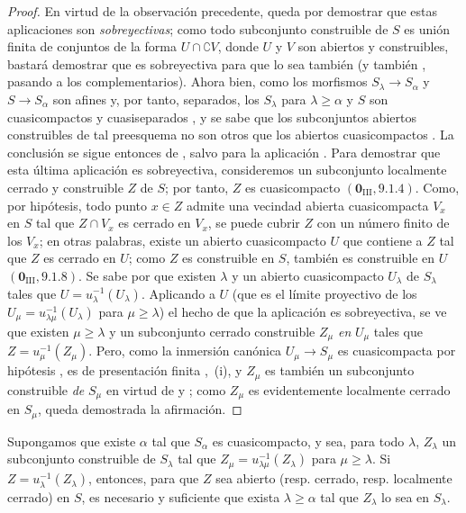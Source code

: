 \begin{proof}
En virtud de la observación precedente, queda por demostrar que estas aplicaciones son \emph{sobreyectivas}; como todo subconjunto construible de $S$ es unión finita de conjuntos de la forma $U\cap\complement V$, donde $U$ y $V$ son abiertos y construibles, bastará demostrar que  es sobreyectiva para que lo sea también  (y también , pasando a los complementarios).
Ahora bien, como los morfismos $S_\lambda\to S_\alpha$ y $S\to S_\alpha$ son afines y, por tanto, separados, los $S_\lambda$ para $\lambda\geq\alpha$ y $S$ son cuasicompactos y cuasiseparados , y se sabe que los subconjuntos abiertos construibles de tal preesquema no son otros que los abiertos cuasicompactos .
La conclusión se sigue entonces de , salvo para la aplicación .
Para demostrar que esta última aplicación es sobreyectiva, consideremos un subconjunto localmente cerrado y construible $Z$ de $S$; por tanto, $Z$ es cuasicompacto $(\mathbf{0}_{\mathrm{III}},9.1.4)$.
Como, por hipótesis, todo punto $x\in Z$ admite una vecindad abierta cuasicompacta $V_x$ en $S$ tal que $Z\cap V_x$ es cerrado en $V_x$, se puede cubrir $Z$ con un número finito de los $V_x$; en otras palabras, existe un abierto cuasicompacto $U$ que contiene a $Z$ tal que $Z$ es cerrado en $U$; como $Z$ es construible en $S$, también es construible en $U$ $(\mathbf{0}_{\mathrm{III}},9.1.8)$.
Se sabe por  que existen $\lambda$ y un abierto cuasicompacto $U_\lambda$ de $S_\lambda$ tales que $U=u_\lambda^{-1}(U_\lambda)$.
Aplicando a $U$ (que es el límite proyectivo de los $U_\mu=u_{\lambda\mu}^{-1}(U_\lambda)$ para $\mu\geq\lambda$) el hecho de que la aplicación  es sobreyectiva, se ve que existen $\mu\geq\lambda$ y un subconjunto cerrado construible $Z_\mu$ \emph{en} $U_\mu$ tales que $Z=u_\mu^{-1}(Z_\mu)$.
Pero, como la inmersión canónica $U_\mu\to S_\mu$ es cuasicompacta por hipótesis , es de presentación finita ,~(i), y $Z_\mu$ es también un subconjunto construible \emph{de} $S_\mu$ en virtud de  y ; como $Z_\mu$ es evidentemente localmente cerrado en $S_\mu$, queda demostrada la afirmación.
\end{proof}

\begin{corollary}[8.3.12]
\label{IV.8.3.12-fr}
Supongamos que existe $\alpha$ tal que $S_\alpha$ es cuasicompacto, y sea, para todo $\lambda$, $Z_\lambda$ un subconjunto construible de $S_\lambda$ tal que $Z_\mu=u_{\lambda\mu}^{-1}(Z_\lambda)$ para $\mu\geq\lambda$.
Si $Z=u_\lambda^{-1}(Z_\lambda)$,
entonces, para que $Z$ sea abierto \textup{(resp.} cerrado, \textup{resp.} localmente cerrado) en $S$, es necesario y suficiente que exista $\lambda\geq\alpha$ tal que $Z_\lambda$ lo sea en $S_\lambda$.
\end{corollary}

